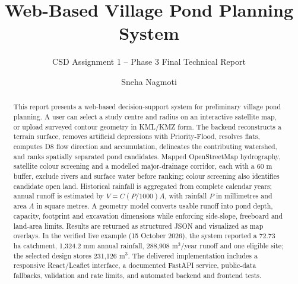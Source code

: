\documentclass[manuscript,screen,review]{acmart}
\begin{document}
\title{Web-Based Village Pond Planning System}
\subtitle{CSD Assignment 1 -- Phase 3 Final Technical Report}

\author{Sneha Nagmoti}
\renewcommand{\shortauthors}{Nagmoti}

\begin{abstract}
This report presents a web-based decision-support system for preliminary village pond planning. A user can select a study centre and radius on an interactive satellite map, or upload surveyed contour geometry in KML/KMZ form. The backend reconstructs a terrain surface, removes artificial depressions with Priority-Flood, resolves flats, computes D8 flow direction and accumulation, delineates the contributing watershed, and ranks spatially separated pond candidates. Mapped OpenStreetMap hydrography, satellite colour screening and a modelled major-drainage corridor, each with a 60 m buffer, exclude rivers and surface water before ranking; colour screening also identifies candidate open land. Historical rainfall is aggregated from complete calendar years; annual runoff is estimated by $V=C(P/1000)A$, with rainfall $P$ in millimetres and area $A$ in square metres. A geometry model converts usable runoff into pond depth, capacity, footprint and excavation dimensions while enforcing side-slope, freeboard and land-area limits. Results are returned as structured JSON and visualized as map overlays. In the verified live example (15 October 2026), the system reported a 72.73 ha catchment, 1,324.2 mm annual rainfall, 288,908 m$^3$/year runoff and one eligible site; the selected design stores 231,126 m$^3$. The delivered implementation includes a responsive React/Leaflet interface, a documented FastAPI service, public-data fallbacks, validation and rate limits, and automated backend and frontend tests.
\end{abstract}


\maketitle
\end{document}
